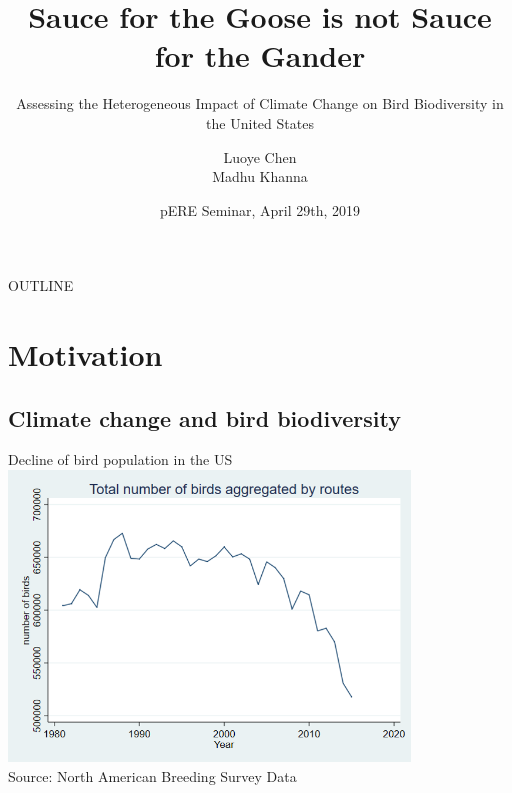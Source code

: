 \documentclass[handout]{beamer}
\title[Sauce for the Goose is not Sauce for the Gander] %
{Sauce for the Goose is not Sauce for the Gander}
\subtitle
{Assessing the Heterogeneous Impact of Climate Change on Bird Biodiversity in the United States}
\author[Luoye Chen] %
{Luoye Chen\\ Madhu Khanna\inst{1}}
\institute[UIUC-ACE] %
{
  \inst{1}%
  Department of Agricultural and Consumer Economics\\
  University of Illinois
}
\date[pERE 2018] %
{pERE Seminar, April 29th, 2019}
\begin{document}
\begin{frame}
  \titlepage
\end{frame}

\begin{frame}{OUTLINE}
  \tableofcontents
\end{frame}





\section{Motivation}

\subsection{Climate change and bird biodiversity}

\begin{frame}{Decline of bird population in the US}
  \includegraphics[width=0.8\textwidth]{bird-1.png}\\
  {\footnotesize  Source: North American Breeding Survey Data}
\end{frame}
\end{document}
